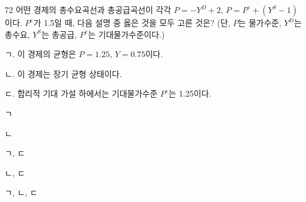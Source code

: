 \begin{question}{72}
어떤 경제의 총수요곡선과 총공급곡선이 각각 $P = -Y^D + 2$, $P = P^e + (Y^S - 1)$이다. $P^e$가 1.5일 때, 다음 설명 중 옳은 것을 모두 고른 것은? (단, $P$는 물가수준, $Y^D$는 총수요, $Y^S$는 총공급, $P^e$는 기대물가수준이다.)
\begin{framedtext}
ㄱ. 이 경제의 균형은 $P = 1.25$, $Y = 0.75$이다. \par
ㄴ. 이 경제는 장기 균형 상태이다. \par
ㄷ. 합리적 기대 가설 하에서는 기대물가수준 $P^e$는 1.25이다. \par
\end{framedtext}
\begin{choices}
  \item ㄱ
  \item ㄴ
  \item ㄱ, ㄷ
  \item ㄴ, ㄷ
  \item ㄱ, ㄴ, ㄷ
\end{choices}
\end{question}
